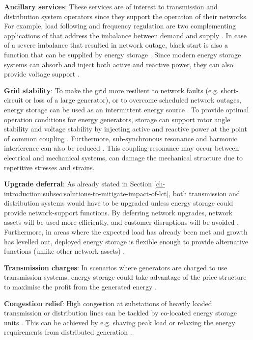 \textbf{Ancillary services}: These services are of interest to transmission and distribution system operators since they support the operation of their networks.
For example, load following and frequency regulation are two complementing applications of that address the imbalance between demand and supply \cite{Bevrani2011}.
In case of a severe imbalance that resulted in network outage, black start is also a function that can be supplied by energy storage \cite{Cole1995, Kashem2007}.
Since modern energy storage systems can absorb and inject both active and reactive power, they can also provide voltage support \cite{Kulkarni2005}.

\textbf{Grid stability}: To make the grid more resilient to network faults (e.g. short-circuit or loss of a large generator), or to overcome scheduled network outages, energy storage can be used as an intermittent energy source \cite{Kundur1993}.
To provide optimal operation conditions for energy generators, storage can support rotor angle stability and voltage stability by injecting active and reactive power at the point of common coupling \cite{Chakraborty2012, Kolluri2002}.
Furthermore, sub-synchronous resonance and harmonic interference can also be reduced \cite{Wang1994}.
This coupling resonance may occur between electrical and mechanical systems, can damage the mechanical structure due to repetitive stresses and strains.

\textbf{Upgrade deferral}: As already stated in Section \ref{ch-introduction:subsec:solutions-to-mitigate-impact-of-lct}, both transmission and distribution systems would have to be upgraded unless energy storage could provide network-support functions.
By deferring network upgrades, network assets will be used more efficiently, and customer disruptions will be avoided \cite{Sayer2007, Eyer2010a}.
Furthermore, in areas where the expected load has already been met and growth has levelled out, deployed energy storage is flexible enough to provide alternative functions (unlike other network assets) \cite{Huff2013}.

\textbf{Transmission charges}: In scenarios where generators are charged to use transmission systems, energy storage could take advantage of the price structure to maximise the profit from the generated energy \cite{Sayer2007, Leou2012}.

\textbf{Congestion relief}: High congestion at substations of heavily loaded transmission or distribution lines can be tackled by co-located energy storage units \cite{Saez-de-Ibarra2013a, Kulkarni2005}.
This can be achieved by e.g. shaving peak load or relaxing the energy requirements from distributed generation \cite{Reihani2016, Gerards2016d}.

